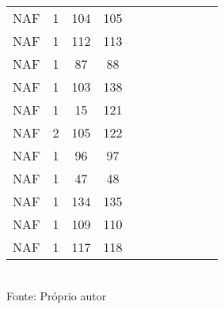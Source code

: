 \begin{table}[H]
{\begin{tabular}{ccccccccccc}
NAF & 1 & 104 & 105 &  &  &  &  &  &  &  \\
NAF & 1 & 112 & 113 &  &  &  &  &  &  &  \\
NAF & 1 & 87 & 88 &  &  &  &  &  &  &  \\
NAF & 1 & 103 & 138 &  &  &  &  &  &  &  \\
NAF & 1 & 15 & 121 &  &  &  &  &  &  &  \\
NAF & 2 & 105 & 122 &  &  &  &  &  &  &  \\
NAF & 1 & 96 & 97 &  &  &  &  &  &  &  \\
NAF & 1 & 47 & 48 &  &  &  &  &  &  &  \\
NAF & 1 & 134 & 135 &  &  &  &  &  &  &  \\
NAF & 1 & 109 & 110 &  &  &  &  &  &  &  \\
NAF & 1 & 117 & 118 &  &  &  &  &  &  &  \\
\bottomrule
\end{tabular}}
\\Fonte: Próprio autor
\end{table}


